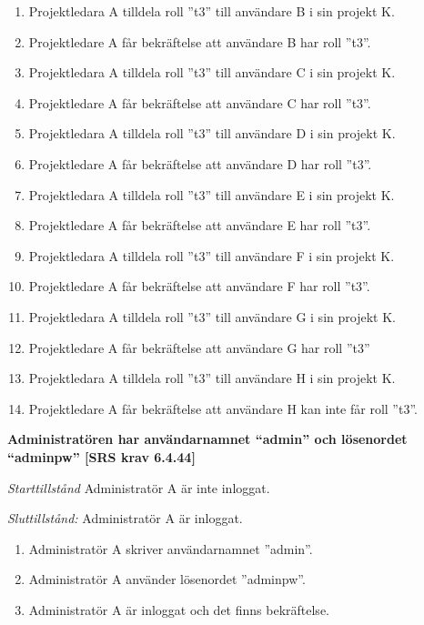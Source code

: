 \documentclass[a4paper]{article}
\begin{document}
\begin{FT}
\begin{enumerate}
\item Projektledara A tilldela roll ”t3” till användare B i sin projekt K. 
\item Projektledare A får bekräftelse att användare B har roll ”t3”.
\item Projektledara A tilldela roll ”t3” till användare C i sin projekt K. 
\item Projektledare A får bekräftelse att användare C har roll ”t3”.
\item Projektledara A tilldela roll ”t3” till användare D i sin projekt K. 
\item Projektledare A får bekräftelse att användare D har roll ”t3”.
\item Projektledara A tilldela roll ”t3” till användare E i sin projekt K. 
\item Projektledare A får bekräftelse att användare E har roll ”t3”.
\item Projektledara A tilldela roll ”t3” till användare F i sin projekt K.
\item Projektledare A får bekräftelse att användare F har roll ”t3”.
\item Projektledara A tilldela roll ”t3” till användare G i sin projekt K. 
\item Projektledare A får bekräftelse att användare G har roll ”t3”
\item Projektledara A tilldela roll ”t3” till användare H i sin projekt K. 
\item Projektledare A får bekräftelse att användare H kan inte får roll ”t3”.
\end{enumerate}

\item %
\textbf{Administratören har användarnamnet “admin” och lösenordet “adminpw” [SRS krav 6.4.44]}

\emph{Starttillstånd} Administratör A är inte inloggat.

\emph{Sluttillstånd:} Administratör A är inloggat.

\begin{enumerate}
\item Administratör A  skriver användarnamnet ”admin”.
\item Administratör A  använder lösenordet ”adminpw”.
\item Administratör A  är inloggat och det finns bekräftelse.
\end{enumerate}






\end{FT}
\end{document}
